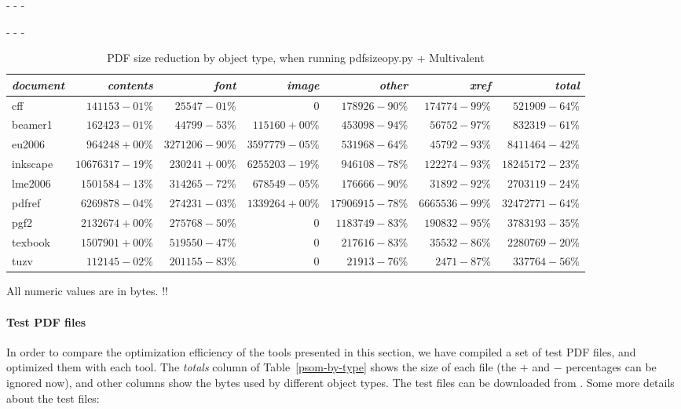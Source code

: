 \documentclass{ltugproc}
\def\cmd{\textsf}
\def\captiontop#1{%
  \advance\abovecaptionskip-\belowcaptionskip
  \advance\belowcaptionskip\abovecaptionskip
  \advance\abovecaptionskip-\belowcaptionskip
  \abovecaptionskip-\abovecaptionskip
  \caption{#1}%
  \advance\abovecaptionskip-\belowcaptionskip
  \advance\belowcaptionskip\abovecaptionskip
  \advance\abovecaptionskip-\belowcaptionskip
  \abovecaptionskip-\abovecaptionskip
}
\begin{document}
\begin{table*}
\captiontop{PDF size reduction by object type, when running
\cmd{pdfsizeopy.py} + Multivalent}\label{tab:psom-by-type}
\par\small\noindent\hfil
\begin{tabular}{@{}lrrrrrr@{}}
\toprule
\emph{document} & \emph{contents} & \emph{font} & \emph{image} & \emph{other} & \emph{xref} & \emph{total} \\\midrule
cff & $141153-01$\% & $25547-01$\% & 0 & $178926-90$\% & $174774-99$\% & $521909-64$\% \\
beamer1 & $162423-01$\% & $44799-53$\% & $115160+00$\% & $453098-94$\% & $56752-97$\% & $832319-61$\% \\
eu2006 & $964248+00$\% & $3271206-90$\% & $3597779-05$\% & $531968-64$\% & $45792-93$\% & $8411464-42$\% \\
inkscape & $10676317-19$\% & $230241+00$\% & $6255203-19$\% & $946108-78$\% & $122274-93$\% & $18245172-23$\% \\
lme2006 & $1501584-13$\% & $314265-72$\% & $678549-05$\% & $176666-90$\% & $31892-92$\% & $2703119-24$\% \\
pdfref & $6269878-04$\% & $274231-03$\% & $1339264+00$\% & $17906915-78$\% & $6665536-99$\% & $32472771-64$\% \\
pgf2 & $2132674+00$\% & $275768-50$\% & 0 & $1183749-83$\% & $190832-95$\% & $3783193-35$\% \\
texbook & $1507901+00$\% & $519550-47$\% & 0 & $217616-83$\% & $35532-86$\% & $2280769-20$\% \\
tuzv & $112145-02$\% & $201155-83$\% & 0 & $21913-76$\% & $2471-87$\% & $337764-56$\% \\
\bottomrule
\end{tabular}
\par\bigskip
\par\noindent All numeric values are in bytes. !!
\end{table*}

\paragraph{Test PDF files}

In order to compare the optimization efficiency of the tools presented in
this section, we have compiled a set of test PDF files, and optimized them
with each tool. The \emph{totals} column of Table~\ref{psom-by-type} shows
the size of each file (the $+$ and $-$ percentages can be ignored now), and
other columns show the bytes used by different object types. The test files
can be downloaded from \cite{example-pdfs}. Some more
details about the test files:
\end{document}
